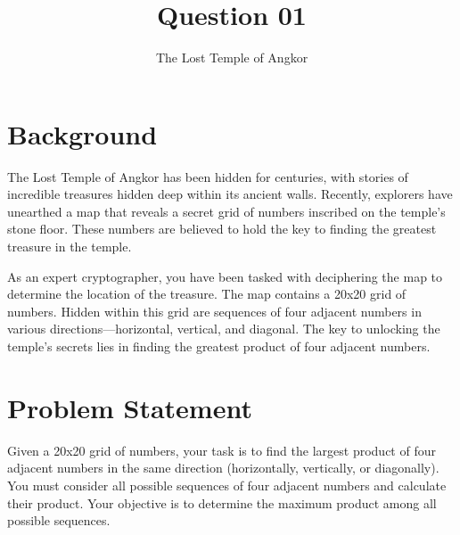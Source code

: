 \documentclass{article}
\title{Question 01}
\author{The Lost Temple of Angkor}
\date{}
\begin{document}
\maketitle

\section*{Background}
The Lost Temple of Angkor has been hidden for centuries, with stories of incredible treasures hidden deep within its ancient walls. Recently, explorers have unearthed a map that reveals a secret grid of numbers inscribed on the temple's stone floor. These numbers are believed to hold the key to finding the greatest treasure in the temple.

As an expert cryptographer, you have been tasked with deciphering the map to determine the location of the treasure. The map contains a 20x20 grid of numbers. Hidden within this grid are sequences of four adjacent numbers in various directions—horizontal, vertical, and diagonal. The key to unlocking the temple's secrets lies in finding the greatest product of four adjacent numbers.

\section*{Problem Statement}
Given a 20x20 grid of numbers, your task is to find the largest product of four adjacent numbers in the same direction (horizontally, vertically, or diagonally). You must consider all possible sequences of four adjacent numbers and calculate their product. Your objective is to determine the maximum product among all possible sequences.
\end{document}
